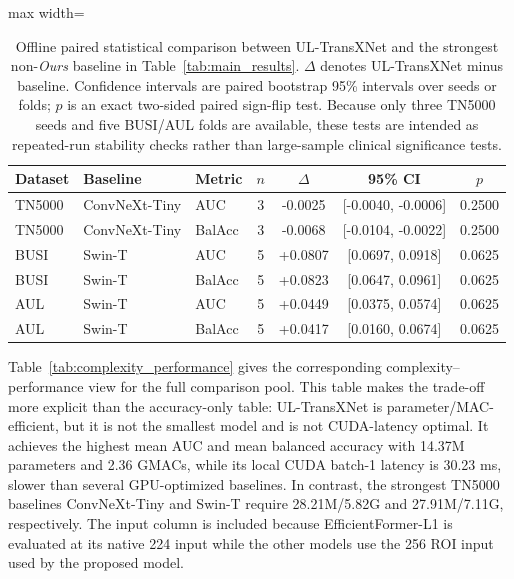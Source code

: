 \begin{table}[t]
    \centering
    \small
    \caption{Offline paired statistical comparison between UL-TransXNet and the strongest non-\textit{Ours} baseline in Table~\ref{tab:main_results}. $\Delta$ denotes UL-TransXNet minus baseline. Confidence intervals are paired bootstrap 95\% intervals over seeds or folds; $p$ is an exact two-sided paired sign-flip test. Because only three TN5000 seeds and five BUSI/AUL folds are available, these tests are intended as repeated-run stability checks rather than large-sample clinical significance tests.}
    \label{tab:paired_statistical_tests}
    \begin{adjustbox}{max width=\columnwidth}
    \begin{tabular}{lllcccc}
        \toprule
        Dataset & Baseline & Metric & $n$ & $\Delta$ & 95\% CI & $p$ \\
        \midrule
        TN5000 & ConvNeXt-Tiny & AUC & 3 & -0.0025 & [-0.0040, -0.0006] & 0.2500 \\
        TN5000 & ConvNeXt-Tiny & BalAcc & 3 & -0.0068 & [-0.0104, -0.0022] & 0.2500 \\
        \midrule
        BUSI & Swin-T & AUC & 5 & +0.0807 & [0.0697, 0.0918] & 0.0625 \\
        BUSI & Swin-T & BalAcc & 5 & +0.0823 & [0.0647, 0.0961] & 0.0625 \\
        \midrule
        AUL & Swin-T & AUC & 5 & +0.0449 & [0.0375, 0.0574] & 0.0625 \\
        AUL & Swin-T & BalAcc & 5 & +0.0417 & [0.0160, 0.0674] & 0.0625 \\
        \bottomrule
    \end{tabular}
    \end{adjustbox}
\end{table}

Table~\ref{tab:complexity_performance} gives the corresponding complexity--performance view for the full comparison pool. This table makes the trade-off more explicit than the accuracy-only table: UL-TransXNet is parameter/MAC-efficient, but it is not the smallest model and is not CUDA-latency optimal. It achieves the highest mean AUC and mean balanced accuracy with 14.37M parameters and 2.36 GMACs, while its local CUDA batch-1 latency is 30.23 ms, slower than several GPU-optimized baselines. In contrast, the strongest TN5000 baselines ConvNeXt-Tiny and Swin-T require 28.21M/5.82G and 27.91M/7.11G, respectively. The input column is included because EfficientFormer-L1 is evaluated at its native 224 input while the other models use the 256 ROI input used by the proposed model.

